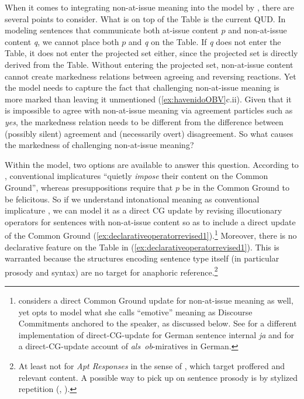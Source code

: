 When it comes to integrating non-at-issue meaning into the model by \citet{FarkasBruce.2010}, there are several points to consider. What is on top of the Table is the current \ac{QUD}. In modeling sentences that communicate both at-issue content $p$ and non-at-issue content \textit{q}, we cannot place both $p$ and \textit{q} on the Table. If \textit{q} does not enter the Table, it does not enter the projected set either, since the projected set is directly derived from the Table. Without entering the projected set, non-at-issue content cannot create markedness relations between agreeing and reversing reactions. Yet the model needs to capture the fact that challenging non-at-issue meaning is more marked than leaving it unmentioned (\ref{ex:havenidoOBV}c.ii). Given that it is impossible to agree with non-at-issue meaning via agreement particles such as \textit{yes}, the markedness relation needs to be different from the difference between (possibly silent) agreement and (necessarily overt) disagreement. So what causes the markedness of challenging non-at-issue meaning?

Within the model, two options are available to answer this question. According to \citet[32]{Potts.2015}, conventional implicatures ``quietly \textit{impose} their content on the Common Ground'', whereas presuppositions require that $p$ be in the Common Ground to be felicitous. So if we understand intonational meaning as conventional implicature \citep{BianchiBocciCruschina.2016}, we can model it as a direct \ac{CG} update by revising illocutionary operators for sentences with non-at-issue content so as to include a direct update of the Common Ground (\ref{ex:declarativeoperatorrevised1}).\footnote{\citet{Rett.2021emotivemarkers} considers a direct Common Ground update for non-at-issue meaning as well, yet opts to model what she calls “emotive” meaning as Discourse Commitments anchored to the speaker, as discussed below. See \citet{Schneider.2017} for a different implementation of direct-\ac{CG}-update for German sentence internal \textit{ja} and \citet[133]{Zimmermann.2019} for a direct-\ac{CG}-update account of \textit{als~ob}-miratives in German.} Moreover, there is no declarative feature on the Table in (\ref{ex:declarativeoperatorrevised1}). This is warranted because the structures encoding sentence type itself (in particular prosody and syntax) are no target for anaphoric reference.\footnote{At least not for \textit{Apt Responses} in the sense of \citet{Roberts.2017}, which target proffered and relevant content. A possible way to pick up on sentence prosody is by stylized repetition (\cite{Persson.2018}, \cite[29]{TorreiraGrice.2018}).}

